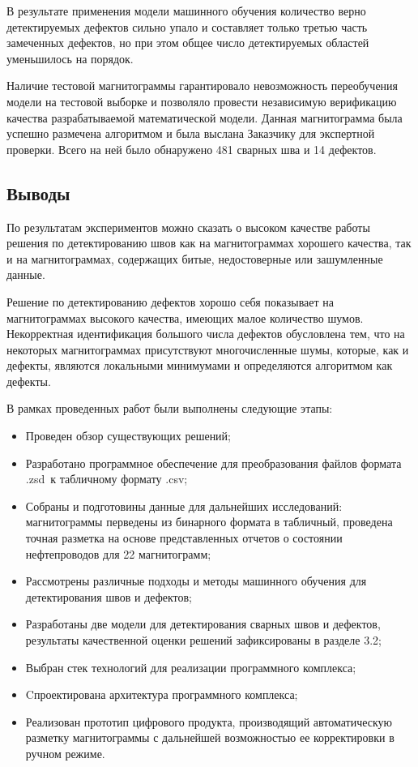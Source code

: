 \documentclass[a4paper,article,14pt]{extarticle}
\begin{document}
В результате применения модели машинного обучения количество верно детектируемых дефектов сильно 
упало и составляет только третью часть замеченных дефектов, но при этом общее число детектируемых 
областей уменьшилось на порядок.

Наличие тестовой магнитограммы гарантировало невозможность переобучения модели на тестовой выборке 
и позволяло провести независимую верификацию качества разрабатываемой математической модели. 
Данная магнитограмма была успешно размечена алгоритмом и была выслана Заказчику для экспертной 
проверки. Всего на ней было обнаружено 481 сварных шва и 14 дефектов.

\subsection{Выводы}

По результатам экспериментов можно сказать о высоком качестве работы решения по детектированию швов 
как на магнитограммах хорошего качества, так и на магнитограммах, содержащих битые, недостоверные или 
зашумленные данные.

Решение по детектированию дефектов хорошо себя показывает на магнитограммах высокого качества, 
имеющих малое количество шумов.  Некорректная идентификация большого числа дефектов обусловлена 
тем, что на некоторых магнитограммах присутствуют многочисленные шумы, которые, как и дефекты, 
являются локальными минимумами и определяются алгоритмом как дефекты.

\pagebreak


В рамках проведенных работ были выполнены следующие этапы:

\begin{itemize}
    \item Проведен обзор существующих решений;
    \item Разработано программное обеспечение для преобразования файлов формата \flqq .zsd\frqq\, к табличному формату \flqq .csv\frqq;
    \item Собраны и подготовины данные для дальнейших исследований: магнитограммы перведены из бинарного формата в табличный, проведена точная разметка на основе представленных отчетов о состоянии нефтепроводов для 22 магнитограмм;
    \item Рассмотрены различные подходы и методы машинного обучения для детектирования швов и дефектов;
    \item Разработаны две модели для детектирования сварных швов и дефектов, результаты качественной оценки решений зафиксированы в разделе 3.2; 
    \item Выбран стек технологий для реализации программного комплекса;
    \item Cпроектирована архитектура программного комплекса;
    \item Реализован прототип цифрового продукта, производящий автоматическую разметку магнитограммы с дальнейшей возможностью ее корректировки в ручном режиме.

\end{itemize}
\end{document}
